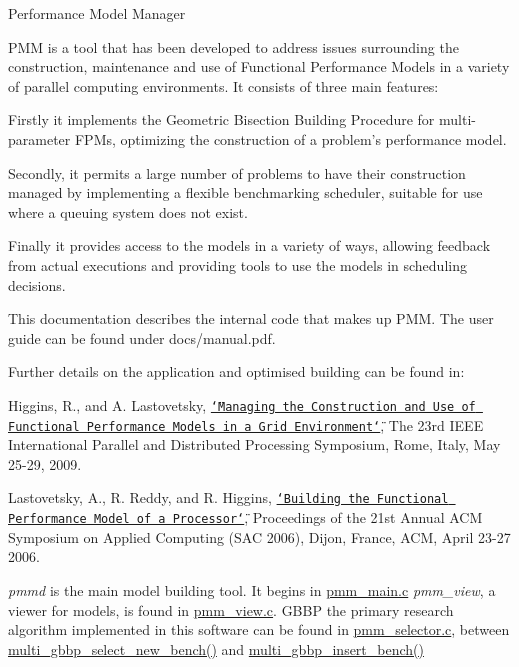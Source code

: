 Performance Model Manager

P\-M\-M is a tool that has been developed to address issues surrounding the construction, maintenance and use of Functional Performance Models in a variety of parallel computing environments. It consists of three main features\-:


\begin{DoxyItemize}
\item Firstly it implements the Geometric Bisection Building Procedure for multi-\/parameter F\-P\-Ms, optimizing the construction of a problem’s performance model.
\item Secondly, it permits a large number of problems to have their construction managed by implementing a flexible benchmarking scheduler, suitable for use where a queuing system does not exist.
\item Finally it provides access to the models in a variety of ways, allowing feedback from actual executions and providing tools to use the models in scheduling decisions.
\end{DoxyItemize}

This documentation describes the internal code that makes up P\-M\-M. The user guide can be found under docs/manual.\-pdf.

Further details on the application and optimised building can be found in\-:

Higgins, R., and A. Lastovetsky, \href{http://hcl.ucd.ie/biblio/266}{\tt \char`\"{}\-Managing the Construction and Use of
\-Functional Performance Models in a Grid Environment\char`\"{}}, The 23rd I\-E\-E\-E International Parallel and Distributed Processing Symposium, Rome, Italy, May 25-\/29, 2009.

Lastovetsky, A., R. Reddy, and R. Higgins, \href{http://hcl.ucd.ie/biblio/59}{\tt \char`\"{}\-Building the Functional Performance Model
of a Processor\char`\"{}}, Proceedings of the 21st Annual A\-C\-M Symposium on Applied Computing (S\-A\-C 2006), Dijon, France, A\-C\-M, April 23-\/27 2006.

{\itshape pmmd} is the main model building tool. It begins in \hyperlink{pmm__main_8c}{pmm\-\_\-main.\-c} {\itshape pmm\-\_\-view}, a viewer for models, is found in \hyperlink{pmm__view_8c}{pmm\-\_\-view.\-c}. G\-B\-B\-P the primary research algorithm implemented in this software can be found in \hyperlink{pmm__selector_8c}{pmm\-\_\-selector.\-c}, between \hyperlink{pmm__selector_8c_a34b247ec5756844a437899a17e31d2fd}{multi\-\_\-gbbp\-\_\-select\-\_\-new\-\_\-bench()} and \hyperlink{pmm__selector_8c_aeeee1b08f092e9bb40ab829caa8eb438}{multi\-\_\-gbbp\-\_\-insert\-\_\-bench()} 